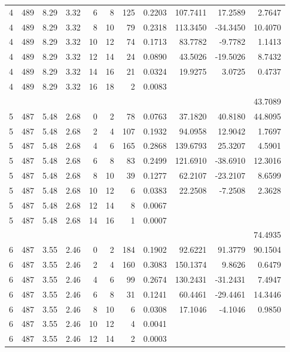\documentclass{article}
\begin{document}
\begin{CJK}{UTF8}{song}
\begin{table}[tbp]
\begin{center}
\begin{threeparttable}[b]
\begin{tabular}{ccccrrrrrrr}
4 & 489 & 8.29 & 3.32 & 6 & 8 & 125 & 0.2203  & 107.7411  & 17.2589  & 2.7647 \\
4 & 489 & 8.29 & 3.32 & 8 & 10 & 79 & 0.2318  & 113.3450  & -34.3450  & 10.4070 \\
4 & 489 & 8.29 & 3.32 & 10 & 12 & 74 & 0.1713  & 83.7782  & -9.7782  & 1.1413 \\
4 & 489 & 8.29 & 3.32 & 12 & 14 & 24 & 0.0890  & 43.5026  & -19.5026  & 8.7432 \\
4 & 489 & 8.29 & 3.32 & 14 & 16 & 21 & 0.0324  & 19.9275  & 3.0725  & 0.4737 \\
4 & 489 & 8.29 & 3.32 & 16 & 18 & 2 & 0.0083  &  &  & \\
 &  &  &  &  &  &  &  &  &  & 43.7089 \\
  \midrule
5 & 487 & 5.48 & 2.68 & 0 & 2 & 78 & 0.0763  & 37.1820  & 40.8180  & 44.8095 \\
5 & 487 & 5.48 & 2.68 & 2 & 4 & 107 & 0.1932  & 94.0958  & 12.9042  & 1.7697 \\
5 & 487 & 5.48 & 2.68 & 4 & 6 & 165 & 0.2868  & 139.6793  & 25.3207  & 4.5901 \\
5 & 487 & 5.48 & 2.68 & 6 & 8 & 83 & 0.2499  & 121.6910  & -38.6910  & 12.3016 \\
5 & 487 & 5.48 & 2.68 & 8 & 10 & 39 & 0.1277  & 62.2107  & -23.2107  & 8.6599 \\
5 & 487 & 5.48 & 2.68 & 10 & 12 & 6 & 0.0383  & 22.2508  & -7.2508  & 2.3628 \\
5 & 487 & 5.48 & 2.68 & 12 & 14 & 8 & 0.0067  &  &  & \\
5 & 487 & 5.48 & 2.68 & 14 & 16 & 1 & 0.0007  &  &  & \\
 &  &  &  &  &  &  &  &  &  & 74.4935 \\
  \midrule
6 & 487 & 3.55 & 2.46 & 0 & 2 & 184 & 0.1902  & 92.6221  & 91.3779  & 90.1504 \\
6 & 487 & 3.55 & 2.46 & 2 & 4 & 160 & 0.3083  & 150.1374  & 9.8626  & 0.6479 \\
6 & 487 & 3.55 & 2.46 & 4 & 6 & 99 & 0.2674  & 130.2431  & -31.2431  & 7.4947 \\
6 & 487 & 3.55 & 2.46 & 6 & 8 & 31 & 0.1241  & 60.4461  & -29.4461  & 14.3446 \\
6 & 487 & 3.55 & 2.46 & 8 & 10 & 6 & 0.0308  & 17.1046  & -4.1046  & 0.9850 \\
6 & 487 & 3.55 & 2.46 & 10 & 12 & 4 & 0.0041  &  &  & \\
6 & 487 & 3.55 & 2.46 & 12 & 14 & 2 & 0.0003  &  &  & \\

\end{tabular}
\end{threeparttable}
\end{center}
\end{table}
\end{CJK}
\end{document}
